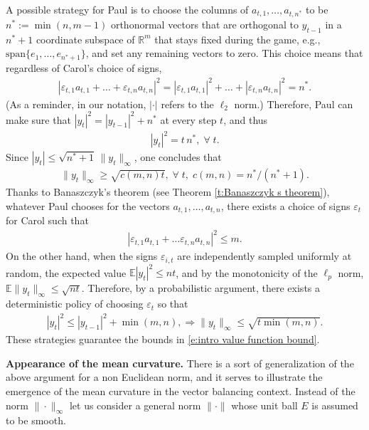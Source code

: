 \documentclass[reqno]{amsart}
\numberwithin{equation}{section}
\newcommand{\R}{\mathbb R}
\newcommand{\eps}{\varepsilon}
\def \E{\mathbb{E}}
\begin{document}
A possible strategy for Paul is to choose the columns of $a_{t,1},\dots, a_{t,n^*}$ to be $n^*:=\min(n,m-1)$ orthonormal vectors that are  orthogonal  to $y_{t-1}$ in a $n^*+1$ coordinate subspace of $\R^m$ that stays fixed during the game, e.g., $\text{span} \{e_1,\dots, e_{n^*+1}\}$, and set any remaining vectors to zero. This choice means that regardless of Carol's choice of signs,
\begin{align*}
  |\varepsilon_{t,1}a_{t,1}+\ldots+\varepsilon_{t,n}a_{t,n}|^2 = |\varepsilon_{t,1}a_{t,1}|^2+\ldots+|\varepsilon_{t,n}a_{t,n}|^2 = n^*.    
\end{align*}
(As a reminder, in our notation, $|\cdot |$ refers to the $\ell_2$ norm.) Therefore, Paul can make sure that $|y_t|^2 = |y_{t-1}|^2 + n^*$ at every step $t$, and thus
\begin{align*}
  |y_t|^2 = t \, n^*,\;\forall\;t.    
\end{align*}
Since $|y_t| \leq \sqrt{n^*+1}\,\|y_t\|_\infty$, one concludes that 
\begin{align*}
 \|y_t\|_\infty \geq \sqrt{c(m,n)t}, \;\forall\;t,\;c(m,n) = n^*/(n^*+1).
\end{align*}
Thanks to Banaszczyk's theorem (see Theorem \ref{t:Banaszczyk s theorem}), whatever Paul chooses for the vectors $a_{t,1},\ldots,a_{t,n}$, there exists a choice of signs $\varepsilon_t$ for Carol such that 
\begin{align*}
|\varepsilon_{t,1}a_{t,1}+\ldots\varepsilon_{t,n}a_{t,n}|^2 \leq m.   
\end{align*}
On the other hand, when the signs $\eps_{i,t}$ are independently sampled uniformly at random, the expected value  $\E | y_t |^2 \leq n t $, and  by the monotonicity of the $\ell_p$  norm, $\E \| y_t \|_\infty \leq \sqrt {n t}$. Therefore, by  a probabilistic argument, there exists a deterministic policy  of choosing  $\eps_t$ so that
\begin{align*}
  |y_{t}|^2 \leq |y_{t-1}|^2 + \min(m,n), \Rightarrow \|y_t\|_\infty \leq \sqrt{t\min(m,n)}.
\end{align*}
These strategies guarantee the bounds in \eqref{e:intro value function bound}.

\textbf{Appearance of the mean curvature.} There is a sort of generalization of the above argument for a non Euclidean norm, and it serves to illustrate the emergence of the mean curvature in the  vector balancing context. Instead of the norm $\|\cdot\|_\infty$ let us consider a general  norm $\|\cdot\|$ whose unit ball $E$ is assumed to be smooth. 
\end{document}
